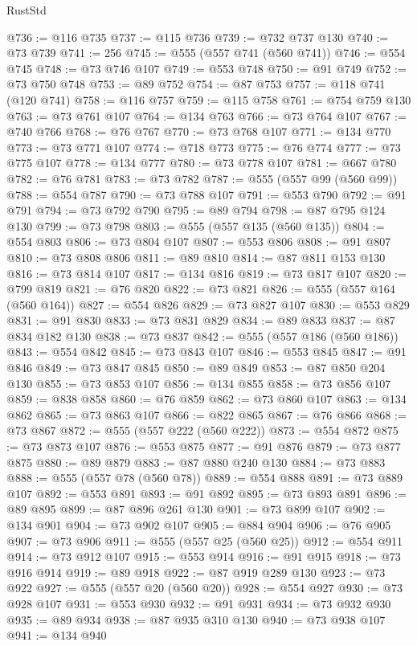 \begin{lexlean}{RustStd}
\begin{coremodule}
@736 := @116 @735
@737 := @115 @736
@739 := @732 @737 @130
@740 := @73 @739
@741 := 256
@745 := @555 (@557 @741 (@560 @741))
@746 := @554 @745
@748 := @73 @746 @107
@749 := @553 @748
@750 := @91 @749
@752 := @73 @750 @748
@753 := @89 @752
@754 := @87 @753
@757 := @118 @741 (@120 @741)
@758 := @116 @757
@759 := @115 @758
@761 := @754 @759 @130
@763 := @73 @761 @107
@764 := @134 @763
@766 := @73 @764 @107
@767 := @740 @766
@768 := @76 @767
@770 := @73 @768 @107
@771 := @134 @770
@773 := @73 @771 @107
@774 := @718 @773
@775 := @76 @774
@777 := @73 @775 @107
@778 := @134 @777
@780 := @73 @778 @107
@781 := @667 @780
@782 := @76 @781
@783 := @73 @782
@787 := @555 (@557 @99 (@560 @99))
@788 := @554 @787
@790 := @73 @788 @107
@791 := @553 @790
@792 := @91 @791
@794 := @73 @792 @790
@795 := @89 @794
@798 := @87 @795 @124 @130
@799 := @73 @798
@803 := @555 (@557 @135 (@560 @135))
@804 := @554 @803
@806 := @73 @804 @107
@807 := @553 @806
@808 := @91 @807
@810 := @73 @808 @806
@811 := @89 @810
@814 := @87 @811 @153 @130
@816 := @73 @814 @107
@817 := @134 @816
@819 := @73 @817 @107
@820 := @799 @819
@821 := @76 @820
@822 := @73 @821
@826 := @555 (@557 @164 (@560 @164))
@827 := @554 @826
@829 := @73 @827 @107
@830 := @553 @829
@831 := @91 @830
@833 := @73 @831 @829
@834 := @89 @833
@837 := @87 @834 @182 @130
@838 := @73 @837
@842 := @555 (@557 @186 (@560 @186))
@843 := @554 @842
@845 := @73 @843 @107
@846 := @553 @845
@847 := @91 @846
@849 := @73 @847 @845
@850 := @89 @849
@853 := @87 @850 @204 @130
@855 := @73 @853 @107
@856 := @134 @855
@858 := @73 @856 @107
@859 := @838 @858
@860 := @76 @859
@862 := @73 @860 @107
@863 := @134 @862
@865 := @73 @863 @107
@866 := @822 @865
@867 := @76 @866
@868 := @73 @867
@872 := @555 (@557 @222 (@560 @222))
@873 := @554 @872
@875 := @73 @873 @107
@876 := @553 @875
@877 := @91 @876
@879 := @73 @877 @875
@880 := @89 @879
@883 := @87 @880 @240 @130
@884 := @73 @883
@888 := @555 (@557 @78 (@560 @78))
@889 := @554 @888
@891 := @73 @889 @107
@892 := @553 @891
@893 := @91 @892
@895 := @73 @893 @891
@896 := @89 @895
@899 := @87 @896 @261 @130
@901 := @73 @899 @107
@902 := @134 @901
@904 := @73 @902 @107
@905 := @884 @904
@906 := @76 @905
@907 := @73 @906
@911 := @555 (@557 @25 (@560 @25))
@912 := @554 @911
@914 := @73 @912 @107
@915 := @553 @914
@916 := @91 @915
@918 := @73 @916 @914
@919 := @89 @918
@922 := @87 @919 @289 @130
@923 := @73 @922
@927 := @555 (@557 @20 (@560 @20))
@928 := @554 @927
@930 := @73 @928 @107
@931 := @553 @930
@932 := @91 @931
@934 := @73 @932 @930
@935 := @89 @934
@938 := @87 @935 @310 @130
@940 := @73 @938 @107
@941 := @134 @940

\end{coremodule}
\end{lexlean}
